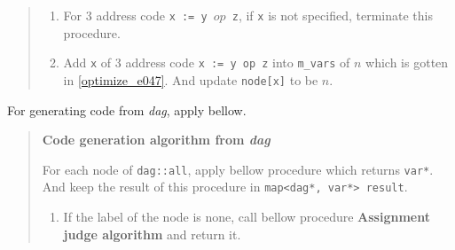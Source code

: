 \begin{quote}
\begin{enumerate}
\item For 3 address code {\tt{x := y $op$ z}}, if {\tt{x}} is not specified,
      terminate this procedure.

\item Add {\tt{x}} of 3 address code {\tt{x := y op z}} into
      {\tt{m\_vars}} of $n$ which is gotten in \ref{optimize_e047}.
      And update {\tt{node[x]}} to be $n$. 
\end{enumerate}

\end{quote}

For generating code from {\em dag}, apply bellow.

\begin{quote}
{\bf Code generation algorithm from {\em dag}}

For each node of {\tt{dag::all}}, apply bellow procedure which returns
{\tt{var*}}. And keep the result of this procedure in
{\tt{map<dag*, var*> result}}.

\begin{enumerate}
\item If the label of the node is none, call bellow procedure
      {\bf Assignment judge algorithm} and return it.


\end{enumerate}
\end{quote}
